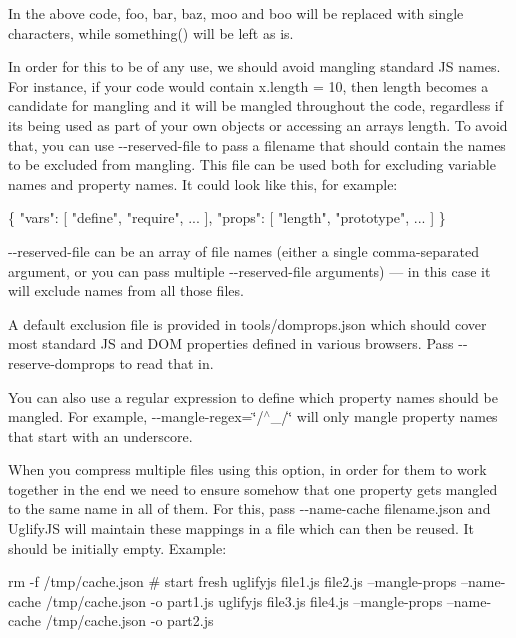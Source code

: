 In the above code, {\ttfamily foo}, {\ttfamily bar}, {\ttfamily baz}, {\ttfamily moo} and {\ttfamily boo} will be replaced with single characters, while {\ttfamily something()} will be left as is.

In order for this to be of any use, we should avoid mangling standard JS names. For instance, if your code would contain {\ttfamily x.\+length = 10}, then {\ttfamily length} becomes a candidate for mangling and it will be mangled throughout the code, regardless if it\textquotesingle{}s being used as part of your own objects or accessing an array\textquotesingle{}s length. To avoid that, you can use {\ttfamily -\/-\/reserved-\/file} to pass a filename that should contain the names to be excluded from mangling. This file can be used both for excluding variable names and property names. It could look like this, for example\+:


\begin{DoxyCode}
\{
  "vars": [ "define", "require", ... ],
  "props": [ "length", "prototype", ... ]
\}
\end{DoxyCode}


{\ttfamily -\/-\/reserved-\/file} can be an array of file names (either a single comma-\/separated argument, or you can pass multiple {\ttfamily -\/-\/reserved-\/file} arguments) — in this case it will exclude names from all those files.

A default exclusion file is provided in {\ttfamily tools/domprops.\+json} which should cover most standard JS and D\+OM properties defined in various browsers. Pass {\ttfamily -\/-\/reserve-\/domprops} to read that in.

You can also use a regular expression to define which property names should be mangled. For example, {\ttfamily -\/-\/mangle-\/regex=\char`\"{}/$^\wedge$\+\_\+/\char`\"{}} will only mangle property names that start with an underscore.

When you compress multiple files using this option, in order for them to work together in the end we need to ensure somehow that one property gets mangled to the same name in all of them. For this, pass {\ttfamily -\/-\/name-\/cache filename.\+json} and Uglify\+JS will maintain these mappings in a file which can then be reused. It should be initially empty. Example\+:


\begin{DoxyCode}
rm -f /tmp/cache.json  # start fresh
uglifyjs file1.js file2.js --mangle-props --name-cache /tmp/cache.json -o part1.js
uglifyjs file3.js file4.js --mangle-props --name-cache /tmp/cache.json -o part2.js
\end{DoxyCode}


